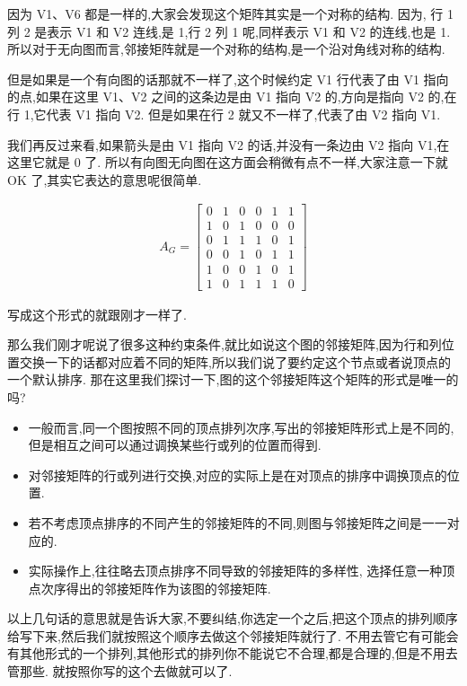 因为 V1、V6 都是一样的,大家会发现这个矩阵其实是一个对称的结构. 因为, 行 1 列 2 是表示 V1 和 V2 连线,是 1,行 2 列 1 呢,同样表示 V1 和 V2 的连线,也是 1. 所以对于无向图而言,邻接矩阵就是一个对称的结构,是一个沿对角线对称的结构. 

但是如果是一个有向图的话那就不一样了,这个时候约定 V1 行代表了由 V1 指向的点,如果在这里 V1、V2 之间的这条边是由 V1 指向 V2 的,方向是指向 V2 的,在行 1,它代表 V1 指向 V2. 但是如果在行 2 就又不一样了,代表了由 V2 指向 V1. 

我们再反过来看,如果箭头是由 V1 指向 V2 的话,并没有一条边由 V2 指向 V1,在这里它就是 0 了. 所以有向图无向图在这方面会稍微有点不一样,大家注意一下就 OK 了,其实它表达的意思呢很简单. 

\begin{align*}
  A_G = \begin{bmatrix} 
  0 & 1 & 0 & 0 & 1 & 1 \\  
  1 & 0 & 1 & 0 & 0 & 0 \\
  0 & 1 & 1 & 1 & 0 & 1 \\ 
  0 & 0 & 1 & 0 & 1 & 1 \\ 
  1 & 0 & 0 & 1 & 0 & 1 \\
  1 & 0 & 1 & 1 & 1 & 0
  \end{bmatrix}
\end{align*}

写成这个形式的就跟刚才一样了. 

那么我们刚才呢说了很多这种约束条件,就比如说这个图的邻接矩阵,因为行和列位置交换一下的话都对应着不同的矩阵,所以我们说了要约定这个节点或者说顶点的一个默认排序. 那在这里我们探讨一下,图的这个邻接矩阵这个矩阵的形式是唯一的吗? 

\begin{itemize}
  \item 一般而言,同一个图按照不同的顶点排列次序,写出的邻接矩阵形式上是不同的,但是相互之间可以通过调换某些行或列的位置而得到. 
  \item 对邻接矩阵的行或列进行交换,对应的实际上是在对顶点的排序中调换顶点的位置. 
  \item 若不考虑顶点排序的不同产生的邻接矩阵的不同,则图与邻接矩阵之间是一一对应的. 
  \item 实际操作上,往往略去顶点排序不同导致的邻接矩阵的多样性, 选择任意一种顶点次序得出的邻接矩阵作为该图的邻接矩阵. 
\end{itemize}

以上几句话的意思就是告诉大家,不要纠结,你选定一个之后,把这个顶点的排列顺序给写下来,然后我们就按照这个顺序去做这个邻接矩阵就行了. 不用去管它有可能会有其他形式的一个排列,其他形式的排列你不能说它不合理,都是合理的,但是不用去管那些. 就按照你写的这个去做就可以了. 

